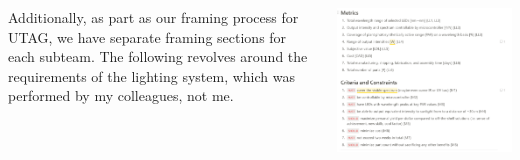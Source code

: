 \documentclass{beamer}
\begin{document}
{    \newpage
    \begin{example}
        \begin{columns}
            \begin{column}{0.4\textwidth}
                Additionally, as part as our framing process for UTAG, we have separate framing sections for each subteam. The following revolves around the requirements of the lighting system, which was performed by my colleagues, not me.
            \end{column}
            \begin{column}{0.6\textwidth}
                \includegraphics[width=\linewidth]{handbook/notion.png}
            \end{column}
        \end{columns}
    \end{example}
}
    
\end{document}
